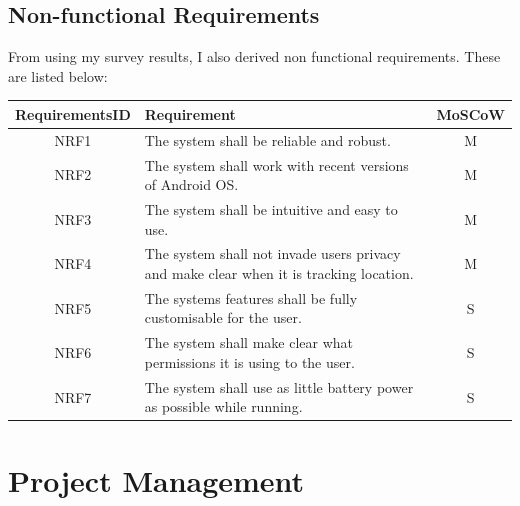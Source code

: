 \documentclass[a4paper]{report}
\begin{document}
\section{Non-functional Requirements}
\label{sec:NonFuncReq}
From using my survey results, I also derived non functional requirements. These are listed below: 
\begin{center}
	\begin{tabular} {|c|p{75mm}|c|}
	\hline
	RequirementsID & Requirement & MoSCoW \\
	\hline
	NRF1 & The system shall be reliable and robust. & M \\
	\hline
	NRF2 & The system shall work with recent versions of Android OS. & M \\
	\hline
	NRF3 & The system shall be intuitive and easy to use. & M \\
	\hline
	NRF4 & The system shall not invade users privacy and make clear when it is tracking location. & M \\
	\hline
	NRF5 & The systems features shall be fully customisable for the user. & S \\
	\hline 
	NRF6 & The system shall make clear what permissions it is using to the user. & S \\
	\hline
	NRF7 & The system shall use as little battery power as possible while running. & S \\
	\hline
\end{tabular}
\end{center}
\newpage

\chapter{Project Management}
\label{sec:ProjectManagement}
\end{document}

